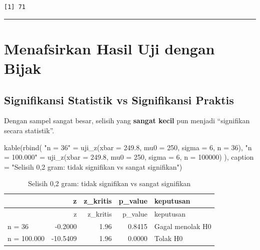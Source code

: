 \documentclass[
  indonesian,
  letterpaper,
]{book}
\newenvironment{Shaded}{\begin{snugshade}}{\end{snugshade}}
\newcommand{\AttributeTok}[1]{\textcolor[rgb]{0.40,0.45,0.13}{#1}}
\newcommand{\DecValTok}[1]{\textcolor[rgb]{0.68,0.00,0.00}{#1}}
\newcommand{\FloatTok}[1]{\textcolor[rgb]{0.68,0.00,0.00}{#1}}
\newcommand{\FunctionTok}[1]{\textcolor[rgb]{0.28,0.35,0.67}{#1}}
\newcommand{\NormalTok}[1]{\textcolor[rgb]{0.00,0.23,0.31}{#1}}
\newcommand{\OtherTok}[1]{\textcolor[rgb]{0.00,0.23,0.31}{#1}}
\newcommand{\StringTok}[1]{\textcolor[rgb]{0.13,0.47,0.30}{#1}}
\begin{document}
\begin{verbatim}
[1] 71
\end{verbatim}

\begin{center}\rule{0.5\linewidth}{0.5pt}\end{center}


\chapter{Menafsirkan Hasil Uji dengan
Bijak}\label{menafsirkan-hasil-uji-dengan-bijak}

\section{Signifikansi Statistik vs Signifikansi
Praktis}\label{signifikansi-statistik-vs-signifikansi-praktis}

Dengan sampel sangat besar, selisih yang \textbf{sangat kecil} pun
menjadi ``signifikan secara statistik''.

\begin{Shaded}
\begin{Highlighting}[]
\FunctionTok{kable}\NormalTok{(}\FunctionTok{rbind}\NormalTok{(}
  \StringTok{"n = 36"}      \OtherTok{=} \FunctionTok{uji\_z}\NormalTok{(}\AttributeTok{xbar =} \FloatTok{249.8}\NormalTok{, }\AttributeTok{mu0 =} \DecValTok{250}\NormalTok{, }\AttributeTok{sigma =} \DecValTok{6}\NormalTok{, }\AttributeTok{n =} \DecValTok{36}\NormalTok{),}
  \StringTok{"n = 100.000"} \OtherTok{=} \FunctionTok{uji\_z}\NormalTok{(}\AttributeTok{xbar =} \FloatTok{249.8}\NormalTok{, }\AttributeTok{mu0 =} \DecValTok{250}\NormalTok{, }\AttributeTok{sigma =} \DecValTok{6}\NormalTok{, }\AttributeTok{n =} \DecValTok{100000}\NormalTok{)}
\NormalTok{), }\AttributeTok{caption =} \StringTok{"Selisih 0,2 gram: tidak signifikan vs sangat signifikan"}\NormalTok{)}
\end{Highlighting}
\end{Shaded}

\begin{longtable}[]{@{}lrrrl@{}}
\caption{Selisih 0,2 gram: tidak signifikan vs sangat
signifikan}\tabularnewline
\toprule\noalign{}
& z & z\_kritis & p\_value & keputusan \\
\midrule\noalign{}
\endfirsthead
\toprule\noalign{}
& z & z\_kritis & p\_value & keputusan \\
\midrule\noalign{}
\endhead
\bottomrule\noalign{}
\endlastfoot
n = 36 & -0.2000 & 1.96 & 0.8415 & Gagal menolak H0 \\
n = 100.000 & -10.5409 & 1.96 & 0.0000 & Tolak H0 \\
\end{longtable}
\end{document}
